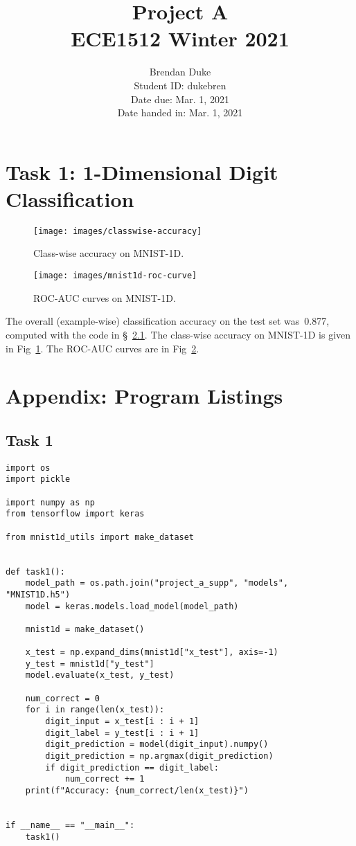 \documentclass{article}
\title{Project A \\ECE1512 Winter 2021}
\author{Brendan Duke\\Student ID: dukebren\\Date due: Mar. 1, 2021\\Date handed in: Mar. 1, 2021}
\date{}
\begin{document}
\maketitle
\clearpage


\section{Task 1: 1-Dimensional Digit Classification}

\begin{figure}[t]
	\texttt{[image: images/classwise-accuracy]}
	\caption{\label{fig:mnist1d-classwise-accuracy}Class-wise accuracy on MNIST-1D\@.}
\end{figure}

\begin{figure}[t]
	\texttt{[image: images/mnist1d-roc-curve]}
	\caption{\label{fig:mnist1d-roc-curve}ROC-AUC curves on MNIST-1D\@.}
\end{figure}

The overall (example-wise) classification accuracy on the test set was~\num{0.877}, computed with the code in \S~\ref{sec:task1-listing}.
The class-wise accuracy on MNIST-1D is given in Fig~\ref{fig:mnist1d-classwise-accuracy}.
The ROC-AUC curves are in Fig~\ref{fig:mnist1d-roc-curve}.


\clearpage
\appendix
\section{Appendix: Program Listings}

\subsection{Task 1}
\label{sec:task1-listing}

\begin{lstlisting}
import os
import pickle

import numpy as np
from tensorflow import keras

from mnist1d_utils import make_dataset


def task1():
    model_path = os.path.join("project_a_supp", "models", "MNIST1D.h5")
    model = keras.models.load_model(model_path)

    mnist1d = make_dataset()

    x_test = np.expand_dims(mnist1d["x_test"], axis=-1)
    y_test = mnist1d["y_test"]
    model.evaluate(x_test, y_test)

    num_correct = 0
    for i in range(len(x_test)):
        digit_input = x_test[i : i + 1]
        digit_label = y_test[i : i + 1]
        digit_prediction = model(digit_input).numpy()
        digit_prediction = np.argmax(digit_prediction)
        if digit_prediction == digit_label:
            num_correct += 1
    print(f"Accuracy: {num_correct/len(x_test)}")


if __name__ == "__main__":
    task1()
\end{lstlisting}
\end{document}
